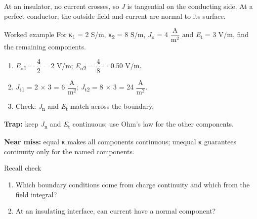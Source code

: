 \documentclass[11pt]{article}
\begin{document}
\begin{keepsection}
At an insulator, no current crosses, so \textit{J} is tangential on the conducting side. At a perfect conductor, the outside field and current are normal to its surface.

\begin{workedbox}{Worked example}
For κ\textsubscript{1} = 2 S/m, κ\textsubscript{2} = 8 S/m, \textit{J}\textsubscript{n} = 4 {\small\ensuremath{\dfrac{\mathrm{A}}{\mathrm{m}^{2}}}} and \textit{E}\textsubscript{t} = 3 V/m, find the remaining components.

\begin{enumerate}
\item \textit{E}\textsubscript{n1} = {\small\ensuremath{\dfrac{4}{2}}} = 2 V/m; \textit{E}\textsubscript{n2} = {\small\ensuremath{\dfrac{4}{8}}} = 0.50 V/m.
\item \textit{J}\textsubscript{t1} = 2 \ensuremath{\times} 3 = 6 {\small\ensuremath{\dfrac{\mathrm{A}}{\mathrm{m}^{2}}}}; \textit{J}\textsubscript{t2} = 8 \ensuremath{\times} 3 = 24 {\small\ensuremath{\dfrac{\mathrm{A}}{\mathrm{m}^{2}}}}.
\item Check: \textit{J}\textsubscript{n} and \textit{E}\textsubscript{t} match across the boundary.
\end{enumerate}
\end{workedbox}

\begin{notebox}\textbf{Trap:} keep \textit{J}\textsubscript{n} and \textit{E}\textsubscript{t} continuous; use Ohm’s law for the other components.\end{notebox}

\begin{notebox}\textbf{Near miss:} equal κ makes all components continuous; unequal κ guarantees continuity only for the named components.\end{notebox}

\begin{recallbox}{Recall check}
\begin{enumerate}
\item Which boundary conditions come from charge continuity and which from the field integral?
\item At an insulating interface, can current have a normal component?
\end{enumerate}

\end{recallbox}
\end{keepsection}
\end{document}
